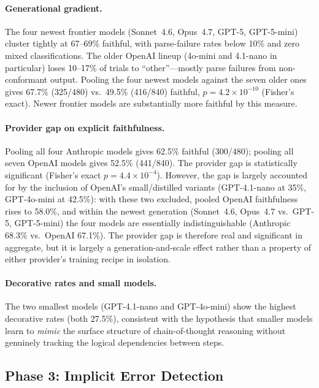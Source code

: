 \documentclass{article}
\begin{document}
\paragraph{Generational gradient.} The four newest frontier models (Sonnet~4.6, Opus~4.7, GPT-5, GPT-5-mini) cluster tightly at 67--69\% faithful, with parse-failure rates below 10\% and zero mixed classifications. The older OpenAI lineup (4o-mini and 4.1-nano in particular) loses 10--17\% of trials to ``other''---mostly parse failures from non-conformant output. Pooling the four newest models against the seven older ones gives 67.7\% (325/480) vs.\ 49.5\% (416/840) faithful, $p=4.2\!\times\!10^{-10}$ (Fisher's exact). Newer frontier models are substantially more faithful by this measure.

\paragraph{Provider gap on explicit faithfulness.}
\label{para:phase2-provider}
Pooling all four Anthropic models gives 62.5\% faithful (300/480); pooling all seven OpenAI models gives 52.5\% (441/840). The provider gap is statistically significant (Fisher's exact $p=4.4\!\times\!10^{-4}$). However, the gap is largely accounted for by the inclusion of OpenAI's small/distilled variants (GPT-4.1-nano at 35\%, GPT-4o-mini at 42.5\%): with these two excluded, pooled OpenAI faithfulness rises to 58.0\%, and within the newest generation (Sonnet~4.6, Opus~4.7 vs.\ GPT-5, GPT-5-mini) the four models are essentially indistinguishable (Anthropic 68.3\% vs.\ OpenAI 67.1\%). The provider gap is therefore real and significant in aggregate, but it is largely a generation-and-scale effect rather than a property of either provider's training recipe in isolation.

\paragraph{Decorative rates and small models.} The two smallest models (GPT-4.1-nano and GPT-4o-mini) show the highest decorative rates (both 27.5\%), consistent with the hypothesis that smaller models learn to \emph{mimic} the surface structure of chain-of-thought reasoning without genuinely tracking the logical dependencies between steps.

\subsection{Phase 3: Implicit Error Detection}
\end{document}
